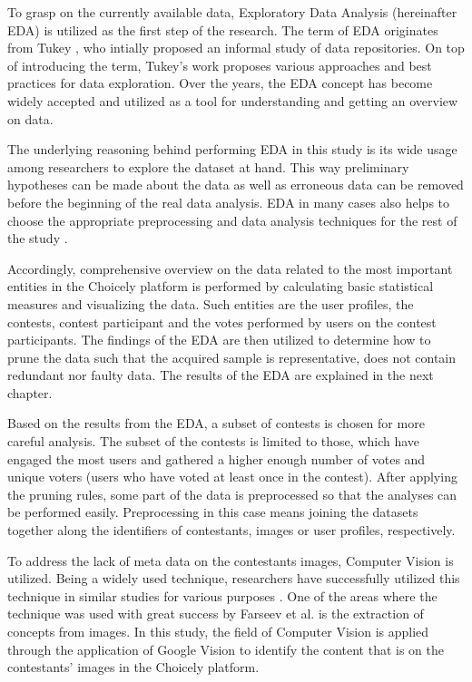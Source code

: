 To grasp on the currently available data, Exploratory Data Analysis (hereinafter EDA) is utilized as the first step of the research. The term of EDA originates from Tukey \cite{tukey77}, who intially proposed an informal study of data repositories. On top of introducing the term, Tukey's work proposes various approaches and best practices for data exploration. Over the years, the EDA concept has become widely accepted and utilized as a tool for understanding and getting an overview on data. 

The underlying reasoning behind performing EDA in this study is its wide usage among researchers to explore the dataset at hand. This way preliminary hypotheses can be made about the data as well as erroneous data can be removed before the beginning of the real data analysis. EDA in many cases also helps to choose the appropriate preprocessing and data analysis techniques for the rest of the study \cite{tukey77, introtodatamining}. 

Accordingly, comprehensive overview on the data related to the most important entities in the Choicely platform is performed by calculating basic statistical measures and visualizing the data. Such entities are the user profiles, the contests, contest participant and the votes performed by users on the contest participants. The findings of the EDA are then utilized to determine how to prune the data such that the acquired sample is representative, does not contain redundant nor faulty data. The results of the EDA are explained in the next chapter. 

Based on the results from the EDA, a subset of contests is chosen for more careful analysis. The subset of the contests is limited to those, which have engaged the most users and gathered a higher enough number of votes and unique voters (users who have voted at least once in the contest). After applying the pruning rules, some part of the data is preprocessed so that the analyses can be performed easily. Preprocessing in this case means joining the datasets together along the identifiers of contestants, images or user profiles, respectively.  

To address the lack of meta data on the contestants images, Computer Vision is utilized. Being a widely used technique, researchers have successfully utilized this technique in similar studies for various purposes \cite{hu2014we, farseev2015harvestingmultiplesources, han2016teensarefrommars, bakhshi2014faces}. One of the areas where the technique was used with great success by Farseev et al. \cite{farseev2015harvestingmultiplesources} is the extraction of concepts from images. In this study, the field of Computer Vision is applied through the application of Google Vision to identify the content that is on the contestants' images in the Choicely platform. 


